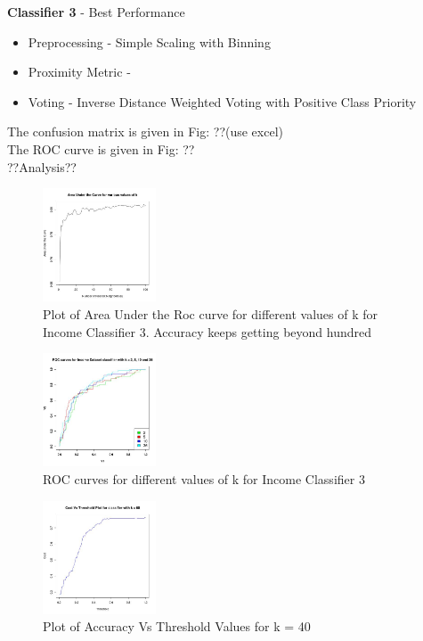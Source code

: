 \textbf{Classifier 3} - Best Performance\\
	\begin{itemize}
		\item Preprocessing - Simple Scaling with Binning
		\item Proximity Metric - 
		\item Voting - Inverse Distance Weighted Voting with Positive Class Priority
	\end{itemize}
	The confusion matrix is given in Fig: ??(use excel)\\
	The ROC curve is given in Fig: ??\\
	??Analysis??\\
	\begin{figure}[h]
		\label{fig:classifier3_auc}
		\caption{Plot of Area Under the Roc curve for different values of k for Income Classifier 3. Accuracy keeps getting beyond hundred}
		\centering
		\includegraphics[width=0.3\textwidth]{images/income_classifier3/auc.jpg}
	\end{figure}	
	\begin{figure}
		\label{fig:classifier1_roc}
		\caption{ROC curves for different values of k for Income Classifier 3}
		\centering
		\includegraphics[width=0.3\textwidth]{images/income_classifier3/roc.jpg}
	\end{figure}
	\begin{figure}
		\label{fig:classifier3_accuracy}
		\caption{Plot of Accuracy Vs Threshold Values for k = 40}
		\centering
		\includegraphics[width=0.3\textwidth]{images/income_classifier3/accuracy.jpg}
	\end{figure}
